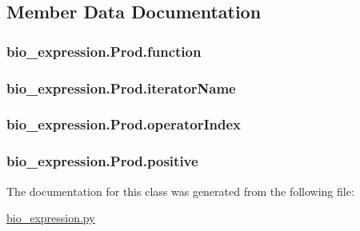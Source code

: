 \subsection{Member Data Documentation}
\hypertarget{classbio__expression_1_1_prod_ad701a84ab99b64715360bd7cd3f23b72}{
\subsubsection[{function}]{\setlength{\rightskip}{0pt plus 5cm}bio\+\_\+expression.\+Prod.\+function}}\label{classbio__expression_1_1_prod_ad701a84ab99b64715360bd7cd3f23b72}
\hypertarget{classbio__expression_1_1_prod_a44847763ff32dfe95d002b49e733bfc2}{
\subsubsection[{iterator\+Name}]{\setlength{\rightskip}{0pt plus 5cm}bio\+\_\+expression.\+Prod.\+iterator\+Name}}\label{classbio__expression_1_1_prod_a44847763ff32dfe95d002b49e733bfc2}
\hypertarget{classbio__expression_1_1_prod_abc58ca6ede4902b55b96afb0ecaf22c7}{
\subsubsection[{operator\+Index}]{\setlength{\rightskip}{0pt plus 5cm}bio\+\_\+expression.\+Prod.\+operator\+Index}}\label{classbio__expression_1_1_prod_abc58ca6ede4902b55b96afb0ecaf22c7}
\hypertarget{classbio__expression_1_1_prod_a2b418ff03d043dd99bca62aef5b42962}{
\subsubsection[{positive}]{\setlength{\rightskip}{0pt plus 5cm}bio\+\_\+expression.\+Prod.\+positive}}\label{classbio__expression_1_1_prod_a2b418ff03d043dd99bca62aef5b42962}


The documentation for this class was generated from the following file\+:\begin{DoxyCompactItemize}
\item 
\hyperlink{bio__expression_8py}{bio\+\_\+expression.\+py}\end{DoxyCompactItemize}
